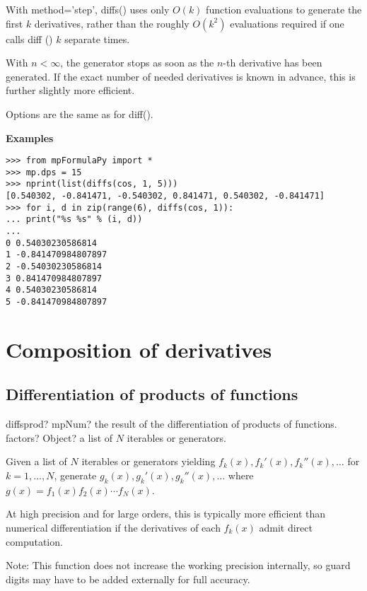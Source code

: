 With method='step', diffs() uses only $O(k)$ function evaluations to generate the first $k$ derivatives, rather than the roughly $O(k^2)$ evaluations required if one calls diff () $k$ separate times.

With $n<\infty$, the generator stops as soon as the $n$-th derivative has been generated. If the exact number of needed derivatives is known in advance, this is further slightly more efficient.

Options are the same as for diff().

\vpara
\textbf{Examples}

\begin{lstlisting}
>>> from mpFormulaPy import *
>>> mp.dps = 15
>>> nprint(list(diffs(cos, 1, 5)))
[0.540302, -0.841471, -0.540302, 0.841471, 0.540302, -0.841471]
>>> for i, d in zip(range(6), diffs(cos, 1)):
... print("%s %s" % (i, d))
...
0 0.54030230586814
1 -0.841470984807897
2 -0.54030230586814
3 0.841470984807897
4 0.54030230586814
5 -0.841470984807897
\end{lstlisting}




\newpage
\section{Composition of derivatives}

\subsection{Differentiation of products of functions}

\begin{mpFunctionsExtract}
	\mpFunctionOne
	{diffsprod? mpNum? the result of the differentiation of products of functions.}
	{factors? Object? a list of $N$ iterables or generators.}	
\end{mpFunctionsExtract}


\vpara
Given a list of $N$ iterables or generators yielding $f_k(x),f_k'(x),f_k''(x),\ldots$ for $k=1,\ldots,N$, generate $g_k(x),g_k'(x),g_k''(x),\ldots$ where $g(x)=f_1(x)f_2(x)\cdots f_N(x)$.

At high precision and for large orders, this is typically more efficient than numerical differentiation if the derivatives of each $f_k(x)$ admit direct computation.

Note: This function does not increase the working precision internally, so guard digits may have to be added externally for full accuracy.

